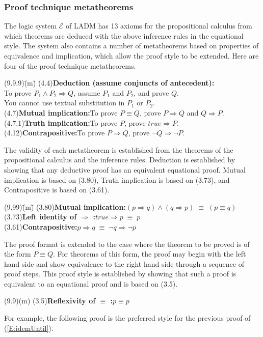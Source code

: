 \documentclass[12pt, fleqn, leqno]{article}
\newcommand{\lgap}{2pt}                             %
\newcommand{\equivs}{\ensuremath{\;\equiv\;}}       %
\newcommand{\impl}{\ensuremath{\Rightarrow}}        %
\begin{document}
\subsubsection*{Proof technique metatheorems}

The logic system $\mathcal{E}$ of LADM \cite{LADM} has 13 axioms for the propositional calculus from which theorems are deduced
with the above inference rules in the equational style.
The system also contains a number of metatheorems based on properties of equivalence and implication, which allow the
proof style to be extended.
Here are four of the proof technique metatheorems.
\begin{tabbing}
(9.9.9)\;\=(m)\;\=\kill
(4.4)\>\textbf{Deduction (assume conjuncts of antecedent):}\\[\lgap]
      \>To prove $P_{1}\land P_{2}\impl Q$, assume $P_{1}$ and $P_{2}$, and prove $Q$.\\[\lgap]
      \>You cannot use textual substitution in $P_{1}$ or $P_{2}$.\\[\lgap]
(4.7)\>\textbf{Mutual implication:}\quad To prove $P\equiv Q$, prove $P\impl Q$ and $Q\impl P$.\\[\lgap]
(4.7.1)\>\textbf{Truth implication:}\quad To prove $P$, prove $true\impl P$.\\[\lgap]
(4.12)\>\textbf{Contrapositive:}\quad To prove $P\impl Q$, prove $\neg Q\impl \neg P$.
\end{tabbing}

The validity of each metatheorem is established from the theorems of the propositional calculus and the inference rules.
Deduction is established by showing that any deductive proof has an equivalent equational proof.
Mutual implication is based on (3.80), Truth implication is based on (3.73), and Contrapositive is based on (3.61).
\begin{tabbing}
(9.99)\;\=(m)\;\=\kill
(3.80)\>\textbf{Mutual implication:}\quad $(p\impl q) \land (q\impl p) \equivs (p\equiv q)$\\[\lgap]
(3.73)\>\textbf{Left identity of $\impl$ :}\quad $true\impl p \equivs p$\\[\lgap]
(3.61)\>\textbf{Contrapositive:}\quad $p\impl q \equivs \neg q\impl \neg p$
\end{tabbing}

The proof format is extended to the case where the theorem to be proved is of the form $P \equiv Q$.
For theorems of this form, the proof may begin with the left hand side and show equivalence to the right hand side through a sequence of proof steps.
This proof style is established by showing that such a proof is equivalent to an equational proof and is based on (3.5).
\begin{tabbing}
(9.9)\;\=(m)\;\=\kill
(3.5)\>\textbf{Reflexivity of $\equiv$ :}\quad $p\equiv p$
\end{tabbing}
For example, the following proof is the preferred style for the previous proof of (\ref{E:idemUntil}).
\end{document}
